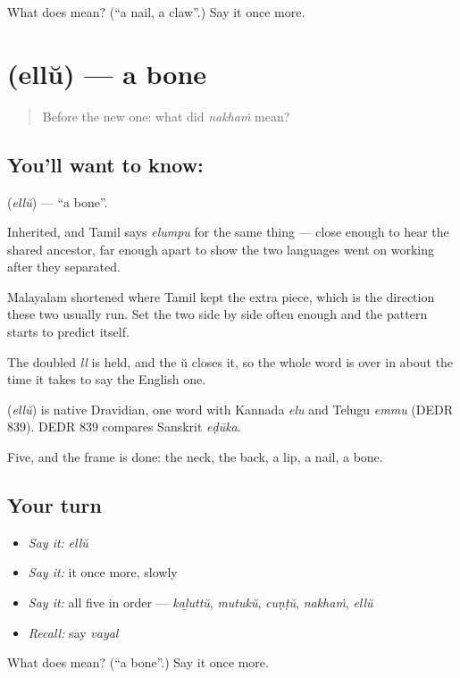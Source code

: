 \begin{tcolorbox}[breakable,colback=teal!4,colframe=teal!35!black,title={Before you move on}]
What does  mean? (\textquotedblleft{}a nail, a claw\textquotedblright{}.) Say it once more.
\end{tcolorbox}
\section[\texorpdfstring{\ml{എല്ല്} (ellŭ)}{എല്ല് (ellŭ)}]{ (ellŭ) — a bone}

\label{lesson:ML-C57-bone}



\begin{quote}
Before the new one: what did \emph{nakhaṁ} mean?
\end{quote}

\subsection*{You'll want to know: }
\textbf{} (\emph{ellŭ}) — \textquotedblleft{}a bone\textquotedblright{}.

Inherited, and Tamil says \emph{elumpu} for the same thing — close enough to hear the shared ancestor, far enough apart to show the two languages went on working after they separated.

Malayalam shortened where Tamil kept the extra piece, which is the direction these two usually run. Set the two side by side often enough and the pattern starts to predict itself.

The doubled \emph{ll} is held, and the ŭ closes it, so the whole word is over in about the time it takes to say the English one.

\begin{cousinweb}
\textbf{} (\emph{ellŭ}) is native Dravidian, one word with Kannada \emph{elu} and Telugu \emph{emmu} (DEDR 839). DEDR 839 compares Sanskrit \emph{eḍūka}.
\end{cousinweb}

\begin{grammarlens}[title={What you've built}]
Five, and the frame is done: the neck, the back, a lip, a nail, a bone.
\end{grammarlens}

\subsection*{Your turn}
\begin{itemize}
\raggedright
  \item \emph{Say it:} \emph{ellŭ}
  \item \emph{Say it:} it once more, slowly
  \item \emph{Say it:} all five in order — \emph{kaḻuttŭ}, \emph{mutukŭ}, \emph{cuṇṭŭ}, \emph{nakhaṁ}, \emph{ellŭ}
  \item \emph{Recall:} say \emph{vayal}
\end{itemize}

\begin{tcolorbox}[breakable,colback=teal!4,colframe=teal!35!black,title={Before you move on}]
What does  mean? (\textquotedblleft{}a bone\textquotedblright{}.) Say it once more.
\end{tcolorbox}
